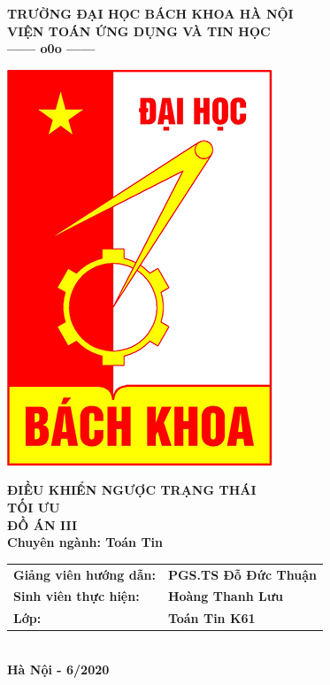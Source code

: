 \documentclass[12pt,a4paper]{report}
\begin{document}
	\thisfancypage{%
	\setlength{\fboxsep}{0pt}%
	\fbox}{} %
\thispagestyle{empty}
\begin{center}
	\vspace*{0.2cm}
	\fontsize{14}{12}
	\textbf{TRƯỜNG ĐẠI HỌC BÁCH KHOA HÀ NỘI}\\
	\textbf{VIỆN TOÁN ỨNG DỤNG VÀ TIN HỌC}\\
	\textbf{------ o0o ------}
\end{center}
\vspace*{0.8cm}
\begin{center}
	\includegraphics[scale=.5]{bk.png}
\end{center}
\vspace*{0.8cm}
\begin{center}
	\fontsize{20}{18}
	\textbf{ĐIỀU KHIỂN NGƯỢC TRẠNG THÁI\\ TỐI ƯU}\\
	\vspace*{0.8cm}
	\fontsize{18}{16}
	\textbf{ĐỒ ÁN III}\\
	\fontsize{14}{16}
	\textbf{Chuyên ngành: Toán Tin}
\end{center}
\vspace*{0.7cm}
\begin{center}
	\fontsize{14}{16}
	\begin{tabular}{ll}
		
		\textbf{Giảng viên hướng dẫn:} & \textbf{PGS.TS Đỗ Đức Thuận} \\ 
		\textbf{Sinh viên thực hiện:} & \textbf{Hoàng Thanh Lưu} \\ 
		\textbf{Lớp:}  & \textbf{Toán Tin K61} \\ 
	\end{tabular} \\
	\vspace*{2.5cm}
	\fontsize{14}{16}
	\textbf{Hà Nội - 6/2020}
\end{center}
\end{document}

